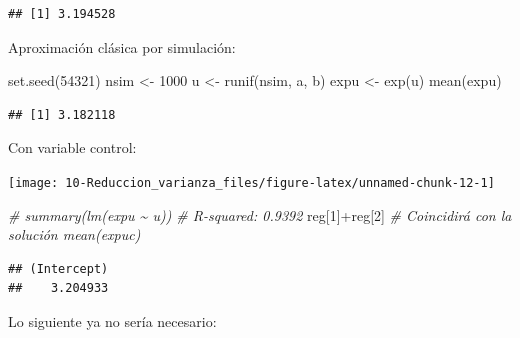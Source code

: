 \documentclass[
]{book}
\newenvironment{Shaded}{\begin{snugshade}}{\end{snugshade}}
\newcommand{\AttributeTok}[1]{\textcolor[rgb]{0.77,0.63,0.00}{#1}}
\newcommand{\CommentTok}[1]{\textcolor[rgb]{0.56,0.35,0.01}{\textit{#1}}}
\newcommand{\DecValTok}[1]{\textcolor[rgb]{0.00,0.00,0.81}{#1}}
\newcommand{\FunctionTok}[1]{\textcolor[rgb]{0.00,0.00,0.00}{#1}}
\newcommand{\NormalTok}[1]{#1}
\newcommand{\OtherTok}[1]{\textcolor[rgb]{0.56,0.35,0.01}{#1}}
\newcommand{\SpecialCharTok}[1]{\textcolor[rgb]{0.00,0.00,0.00}{#1}}
\newcommand{\StringTok}[1]{\textcolor[rgb]{0.31,0.60,0.02}{#1}}
\theoremstyle{break}
\theoremstyle{definition}
\theoremstyle{definition}
\theoremstyle{definition}
\theoremstyle{definition}
\theoremstyle{remark}
\begin{document}
\begin{verbatim}
## [1] 3.194528
\end{verbatim}

Aproximación clásica por simulación:

\begin{Shaded}
\begin{Highlighting}[]
\FunctionTok{set.seed}\NormalTok{(}\DecValTok{54321}\NormalTok{)}
\NormalTok{nsim }\OtherTok{\textless{}{-}} \DecValTok{1000}
\NormalTok{u }\OtherTok{\textless{}{-}} \FunctionTok{runif}\NormalTok{(nsim, a, b)}
\NormalTok{expu }\OtherTok{\textless{}{-}} \FunctionTok{exp}\NormalTok{(u)}
\FunctionTok{mean}\NormalTok{(expu) }
\end{Highlighting}
\end{Shaded}

\begin{verbatim}
## [1] 3.182118
\end{verbatim}

Con variable control:

\begin{Shaded}
\end{Shaded}

\begin{center}\texttt{[image: 10-Reduccion\_varianza\_files/figure-latex/unnamed-chunk-12-1]} \end{center}

\begin{Shaded}
\begin{Highlighting}[]
\CommentTok{\# summary(lm(expu \textasciitilde{} u)) \# R{-}squared: 0.9392}
\NormalTok{reg[}\DecValTok{1}\NormalTok{]}\SpecialCharTok{+}\NormalTok{reg[}\DecValTok{2}\NormalTok{] }\CommentTok{\# Coincidirá con la solución mean(expuc)}
\end{Highlighting}
\end{Shaded}

\begin{verbatim}
## (Intercept) 
##    3.204933
\end{verbatim}

Lo siguiente ya no sería necesario:
\end{document}
